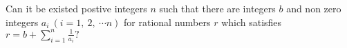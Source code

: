 Can it be existed postive integers $ n$ such that there are integers $ b$ and non zero integers $ a_i\ (i=1,\ 2,\ \cdots n)$ for rational numbers $ r$ which satisfies $ r=b+\sum_{i=1}^n \frac{1}{a_i}?$